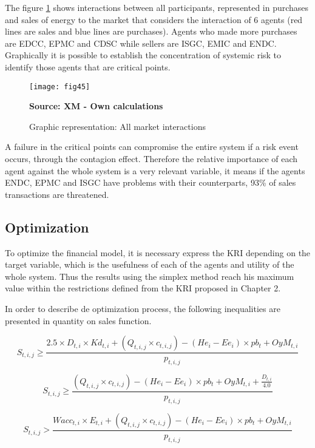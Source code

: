 \documentclass[12pt]{book}
\begin{document}
The figure \ref{Fig 45} shows interactions between all participants, represented in purchases and sales of energy to the market that considers the interaction of 6 agents (red lines are sales and blue lines are purchases). Agents who made more purchases are EDCC, EPMC and  CDSC while sellers are ISGC, EMIC and ENDC. Graphically it is possible to establish the concentration of systemic risk to identify those agents that are critical points.

\begin{figure}  
\centering    
\texttt{[image: fig45]}  
\caption{Graphic representation: All market interactions}
\scriptsize 
\textbf{Source: XM - Own calculations}
\captionsetup{justification=centering,margin=1cm}   
\label{Fig 45}
\end{figure}

A failure in the critical points can compromise the entire system if a risk event occurs, through the contagion effect. Therefore the relative importance of each agent against the whole system is a very relevant variable, it means if the agents ENDC, EPMC and ISGC have problems with their counterparts, 93\% of sales transactions are threatened.

\subsection{Optimization}

To optimize the financial model, it is necessary express the KRI depending on the target variable, which is the usefulness of each of the agents and utility of the whole system. Thus the results using the simplex method reach his maximum value within the restrictions defined from the KRI proposed in Chapter 2.

In order to describe de optimization process, the following inequalities are presented in quantity on sales function.


\begin{equation}
S_{t,i,j} \geq \frac{2.5 \times D_{t,i}\times Kd_{t,i} + (Q_{t,i,j}\times c_{t,i,j}) - (He_{i} - Ee_{i})\times pb_{t} + OyM_{t,i}}{p_{t,i,j}}
\end{equation}

\begin{equation}
S_{t,i,j} \geq \frac{(Q_{t,i,j}\times c_{t,i,j}) - (He_{i} - Ee_{i})\times pb_{t} + OyM_{t,i} + \frac{D_{t,i}}{4.0}}{p_{t,i,j}}
\end{equation}

\begin{equation}
S_{t,i,j} > \frac{Wacc_{t,i} \times E_{t,i} + (Q_{t,i,j}\times c_{t,i,j}) - (He_{i} - Ee_{i})\times pb_{t} + OyM_{t,i}}{p_{t,i,j}}
\end{equation}
\end{document}
